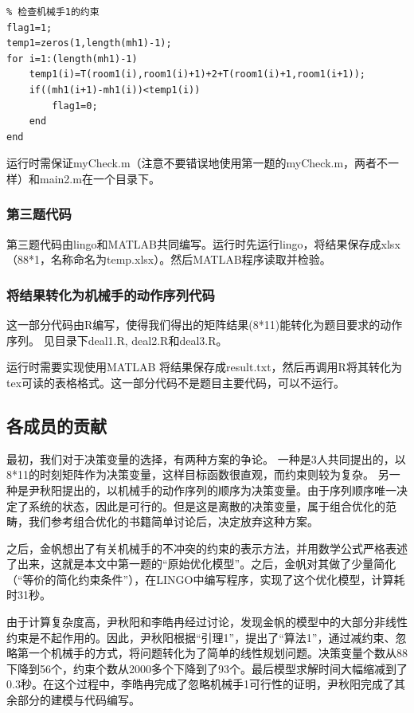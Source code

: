 \documentclass{ctexart}
\begin{document}
{{{\begin{lstlisting}
% 检查机械手1的约束
flag1=1;
temp1=zeros(1,length(mh1)-1);
for i=1:(length(mh1)-1)
	temp1(i)=T(room1(i),room1(i)+1)+2+T(room1(i)+1,room1(i+1));
	if((mh1(i+1)-mh1(i))<temp1(i))
		flag1=0;
	end
end
			\end{lstlisting}
			
			运行时需保证myCheck.m（注意不要错误地使用第一题的myCheck.m，两者不一样）和main2.m在一个目录下。
		}
	
		\subsubsection{第三题代码}
		{
			第三题代码由lingo和MATLAB共同编写。运行时先运行lingo，将结果保存成xlsx（88*1，名称命名为temp.xlsx）。然后MATLAB程序读取并检验。
		}
		\subsubsection{将结果转化为机械手的动作序列代码}
		{
			这一部分代码由R编写，使得我们得出的矩阵结果(8*11)能转化为题目要求的动作序列。
			见目录下deal1.R, deal2.R和deal3.R。
			
			运行时需要实现使用MATLAB  将结果保存成result.txt，然后再调用R将其转化为tex可读的表格格式。这一部分代码不是题目主要代码，可以不运行。
		}
    }

    \subsection{各成员的贡献}
    {
        最初，我们对于决策变量的选择，有两种方案的争论。
        一种是3人共同提出的，以8*11的时刻矩阵作为决策变量，这样目标函数很直观，而约束则较为复杂。
        另一种是尹秋阳提出的，以机械手的动作序列的顺序为决策变量。由于序列顺序唯一决定了系统的状态，因此是可行的。但是这是离散的决策变量，属于组合优化的范畴，我们参考组合优化的书籍简单讨论后，决定放弃这种方案。

        之后，金帆想出了有关机械手的不冲突的约束的表示方法，并用数学公式严格表述了出来，这就是本文中第一题的“原始优化模型”。之后，金帆对其做了少量简化（“等价的简化约束条件”），在LINGO中编写程序，实现了这个优化模型，计算耗时31秒。

        由于计算复杂度高，尹秋阳和李皓冉经过讨论，发现金帆的模型中的大部分非线性约束是不起作用的。因此，尹秋阳根据“引理1”，提出了“算法1”，通过减约束、忽略第一个机械手的方式，将问题转化为了简单的线性规划问题。决策变量个数从88下降到56个，约束个数从2000多个下降到了93个。最后模型求解时间大幅缩减到了0.3秒。在这个过程中，李皓冉完成了忽略机械手1可行性的证明，尹秋阳完成了其余部分的建模与代码编写。

}}
\end{document}
